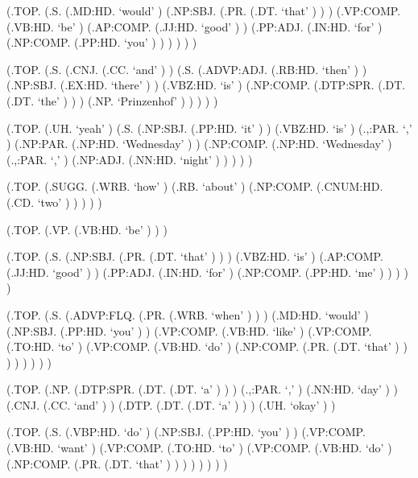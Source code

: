 \documentclass[10pt]{article}
\begin{document}
\begin{parsetree}  (.TOP. (.S. (.MD:HD. `would' ) (.NP:SBJ. (.PR. (.DT. `that' ) ) ) (.VP:COMP. (.VB:HD. `be' ) (.AP:COMP. (.JJ:HD. `good' ) ) (.PP:ADJ. (.IN:HD. `for' ) (.NP:COMP. (.PP:HD. `you' ) ) ) ) ) ) \end{parsetree}

\begin{parsetree}  (.TOP. (.S. (.CNJ. (.CC. `and' ) ) (.S. (.ADVP:ADJ. (.RB:HD. `then' ) ) (.NP:SBJ. (.EX:HD. `there' ) ) (.VBZ:HD. `is' ) (.NP:COMP. (.DTP:SPR. (.DT. (.DT. `the' ) ) ) (.NP. `Prinzenhof' ) ) ) ) ) \end{parsetree}

\begin{parsetree}  (.TOP. (.UH. `yeah' ) (.S. (.NP:SBJ. (.PP:HD. `it' ) ) (.VBZ:HD. `is' ) (.,:PAR. `,' ) (.NP:PAR. (.NP:HD. `Wednesday' ) ) (.NP:COMP. (.NP:HD. `Wednesday' ) (.,:PAR. `,' ) (.NP:ADJ. (.NN:HD. `night' ) ) ) ) ) \end{parsetree}

\begin{parsetree}  (.TOP. (.SUGG. (.WRB. `how' ) (.RB. `about' ) (.NP:COMP. (.CNUM:HD. (.CD. `two' ) ) ) ) ) \end{parsetree}

\begin{parsetree}  (.TOP. (.VP. (.VB:HD. `be' ) ) ) \end{parsetree}

\begin{parsetree}  (.TOP. (.S. (.NP:SBJ. (.PR. (.DT. `that' ) ) ) (.VBZ:HD. `is' ) (.AP:COMP. (.JJ:HD. `good' ) ) (.PP:ADJ. (.IN:HD. `for' ) (.NP:COMP. (.PP:HD. `me' ) ) ) ) ) \end{parsetree}

\begin{parsetree}  (.TOP. (.S. (.ADVP:FLQ. (.PR. (.WRB. `when' ) ) ) (.MD:HD. `would' ) (.NP:SBJ. (.PP:HD. `you' ) ) (.VP:COMP. (.VB:HD. `like' ) (.VP:COMP. (.TO:HD. `to' ) (.VP:COMP. (.VB:HD. `do' ) (.NP:COMP. (.PR. (.DT. `that' ) ) ) ) ) ) ) ) \end{parsetree}

\begin{parsetree}  (.TOP. (.NP. (.DTP:SPR. (.DT. (.DT. `a' ) ) ) (.,:PAR. `,' ) (.NN:HD. `day' ) ) (.CNJ. (.CC. `and' ) ) (.DTP. (.DT. (.DT. `a' ) ) ) (.UH. `okay' ) ) \end{parsetree}

\begin{parsetree}  (.TOP. (.S. (.VBP:HD. `do' ) (.NP:SBJ. (.PP:HD. `you' ) ) (.VP:COMP. (.VB:HD. `want' ) (.VP:COMP. (.TO:HD. `to' ) (.VP:COMP. (.VB:HD. `do' ) (.NP:COMP. (.PR. (.DT. `that' ) ) ) ) ) ) ) ) \end{parsetree}
\end{document}
